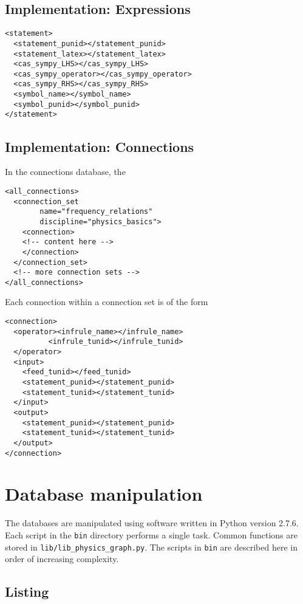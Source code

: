 \documentclass{article}
\begin{document}
\begin{multicols}{2}
\subsection{Implementation: Expressions\label{sec:expressions}}

\begin{verbatim}
<statement>
  <statement_punid></statement_punid>
  <statement_latex></statement_latex>
  <cas_sympy_LHS></cas_sympy_LHS>
  <cas_sympy_operator></cas_sympy_operator>
  <cas_sympy_RHS></cas_sympy_RHS>
  <symbol_name></symbol_name>
  <symbol_punid></symbol_punid>
</statement>
\end{verbatim}

\subsection{Implementation: Connections\label{sec:connections}}

In the connections database, the 
\begin{verbatim}
<all_connections>
  <connection_set 
        name="frequency_relations" 
        discipline="physics_basics">
    <connection>
    <!-- content here -->
    </connection>
  </connection_set>
  <!-- more connection sets -->
</all_connections>
\end{verbatim}

Each connection within a connection set is of the form

\begin{verbatim}
<connection>
  <operator><infrule_name></infrule_name>
          <infrule_tunid></infrule_tunid>
  </operator>
  <input>
    <feed_tunid></feed_tunid>
    <statement_punid></statement_punid>
    <statement_tunid></statement_tunid>
  </input>
  <output>
    <statement_punid></statement_punid>
    <statement_tunid></statement_tunid>
  </output>
</connection>
\end{verbatim}


\section{Database manipulation}

The databases are manipulated using software written in Python\cite{2015_Python} version 2.7.6. 
Each script in the \texttt{bin} directory performs a single task. 
Common functions are stored in \texttt{lib/lib\_physics\_graph.py}. 
The scripts in \texttt{bin} are described here in order of increasing complexity. 

\subsection{Listing}


\end{multicols}
\end{document}
